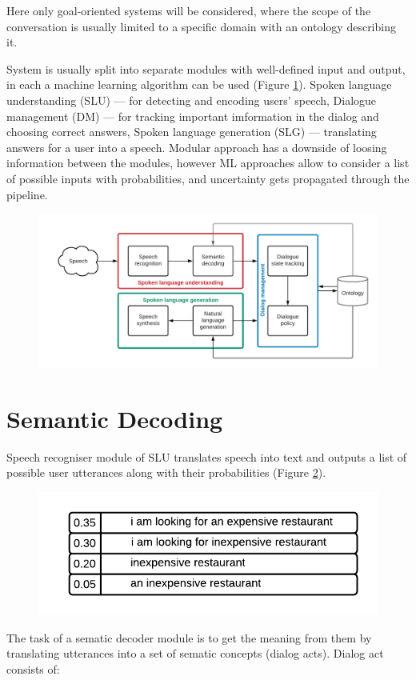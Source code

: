 \documentclass[12pt,titlepage,a4paper]{article}
\begin{document}
Here only goal-oriented systems will be considered, where the scope of the conversation is usually limited to a specific domain with an ontology describing it.

System is usually split into separate modules with well-defined input and output, in each a machine learning algo\-rithm can be used (Figure \ref{fig:SDS-main}). Spoken language understanding (SLU) --- for detecting and encoding users' speech, Dialogue manage\-ment (DM) --- for tracking important imformation in the dialog and choosing correct answers, Spoken language gene\-ration (SLG) --- translating answers for a user into a speech. Modular approach has a downside of loosing information bet\-ween the modules, however ML approaches allow to consider a list of possible inputs with probabilities, and uncertainty gets propagated through the pipeline.

\begin{figure}[!h]
    \includegraphics[width=\linewidth]{SDS-main.png}
    \caption{}
    \label{fig:SDS-main}
\end{figure}


\pagebreak
\section{Semantic Decoding}
Speech recogniser module of SLU translates speech into text and outputs a list of possible user utterances along with their probabilities (Figure \ref{fig:several}).

\begin{figure}[!h]
    \centering
    \includegraphics[width=0.65\linewidth]{uncertanty.png}
    \caption{}
    \label{fig:several}
\end{figure}
The task of a sematic decoder module is to get the meaning from them by translating utterances into a set of sematic concepts (dia\-log acts). Dialog act consists of: 
\end{document}
